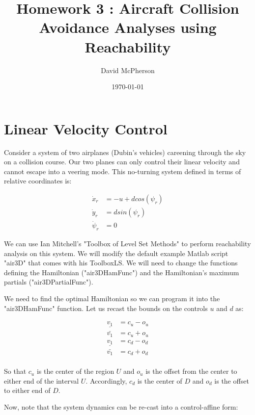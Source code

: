 \documentclass[a4paper]{article}
\title{Homework 3 : Aircraft Collision Avoidance Analyses using Reachability}
\author{David McPherson}
\date{\today}
\begin{document}
\maketitle

\section{Linear Velocity Control}
Consider a system of two airplanes (Dubin's vehicles) careening through the sky on a collision course.
Our two planes can only control their linear velocity and cannot escape into a veering mode.
This no-turning system defined in terms of relative coordinates is:

\begin{align*}
     \dot{x}_r    &= -u + d cos(\psi_r)
  \\ \dot{y}_r    &=  d sin(\psi_r)
  \\ \dot{\psi}_r &=  0
\end{align*}

We can use Ian Mitchell's "Toolbox of Level Set Methods" to perform reachability analysis on this system.
We will modify the default example Matlab script "air3D" that comes with his ToolboxLS.
We will need to change the functions defining the Hamiltonian ("air3DHamFunc") and the Hamiltonian's maximum partials ("air3DPartialFunc").

We need to find the optimal Hamiltonian so we can program it into the "air3DHamFunc" function.
Let us recast the bounds on the controls $u$ and $d$ as:

\begin{align*}
  \underline{v_1} &= c_u - o_u \\
  \bar{v_1}       &= c_u + o_u \\
  \underline{v_1} &= c_d - o_d \\
  \bar{v_1}       &= c_d + o_d \\
\end{align*}

So that $c_u$ is the center of the region $U$ and $o_u$ is the offset from the center to either end of the interval $U$.
Accordingly, $c_d$ is the center of $D$ and $o_d$ is the offset to either end of $D$.

Now, note that the system dynamics can be re-cast into a control-affine form:
\end{document}
